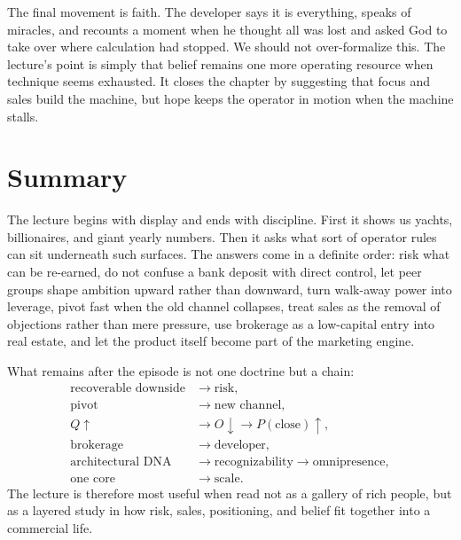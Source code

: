 The final movement is faith. The developer says it is everything, speaks of miracles, and recounts a moment when he thought all was lost and asked God to take over where calculation had stopped. We should not over-formalize this. The lecture's point is simply that belief remains one more operating resource when technique seems exhausted. It closes the chapter by suggesting that focus and sales build the machine, but hope keeps the operator in motion when the machine stalls.

\section{Summary}

The lecture begins with display and ends with discipline. First it shows us yachts, billionaires, and giant yearly numbers. Then it asks what sort of operator rules can sit underneath such surfaces. The answers come in a definite order: risk what can be re-earned, do not confuse a bank deposit with direct control, let peer groups shape ambition upward rather than downward, turn walk-away power into leverage, pivot fast when the old channel collapses, treat sales as the removal of objections rather than mere pressure, use brokerage as a low-capital entry into real estate, and let the product itself become part of the marketing engine.

What remains after the episode is not one doctrine but a chain:
\begin{align}
\text{recoverable downside} &\to \text{risk}, \\
\text{pivot} &\to \text{new channel}, \\
Q\uparrow &\to O\downarrow \to P(\text{close})\uparrow, \\
\text{brokerage} &\to \text{developer}, \\
\text{architectural DNA} &\to \text{recognizability} \to \text{omnipresence}, \\
\text{one core} &\to \text{scale}.
\end{align}
The lecture is therefore most useful when read not as a gallery of rich people, but as a layered study in how risk, sales, positioning, and belief fit together into a commercial life.